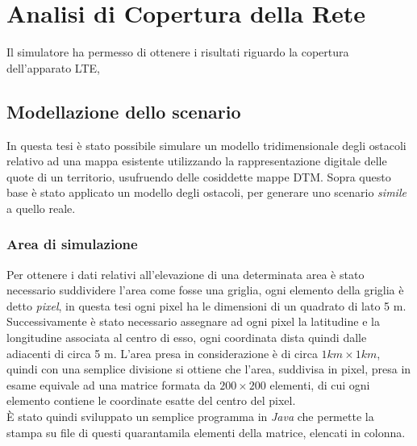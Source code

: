 \chapter{Analisi di Copertura della Rete}
\label{cap:analisi}
Il simulatore ha permesso di ottenere i risultati riguardo la copertura dell'apparato \ac{LTE},
  
\section{Modellazione dello scenario}
\label{cap:dem}
In questa tesi è stato possibile simulare un modello tridimensionale degli ostacoli relativo ad una mappa esistente utilizzando 
la rappresentazione digitale delle quote di un territorio, usufruendo delle cosiddette mappe \ac{DTM}.
Sopra questo base è stato applicato un modello degli ostacoli, per generare uno scenario \emph{simile} a quello reale.
   
\subsection{Area di simulazione}
\label{sec:areasimu}
Per ottenere i dati relativi all'elevazione di una determinata area è stato necessario suddividere l'area come fosse una griglia, ogni
elemento della griglia è detto \emph{pixel}, in questa tesi ogni pixel ha le dimensioni di un quadrato di lato 5 m. \\
Successivamente è stato necessario assegnare ad ogni pixel la latitudine e la longitudine associata al centro di esso, ogni coordinata
dista quindi dalle adiacenti di circa 5 m.
L'area presa in considerazione è di circa $1 km \times 1 km$, quindi con una semplice divisione si ottiene che l'area, suddivisa in pixel, 
presa in esame equivale ad una matrice formata da $200 \times 200$ elementi, di cui ogni elemento contiene le coordinate esatte del centro 
del pixel. \\
È stato quindi sviluppato un semplice programma in \emph{Java} che permette la stampa su file di questi quarantamila elementi della 
matrice, elencati in colonna.

